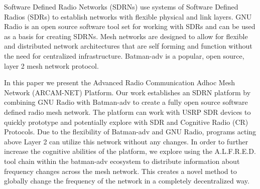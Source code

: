 Software Defined Radio Networks (SDRNs)  use systems of Software Defined Radios (SDRs) to establish networks with flexible physical and link layers. GNU Radio is an open source software tool set for working with SDRs and can be used as a basis for creating SDRNs. Mesh networks are designed to allow for flexible and distributed network architectures that are self forming and function without the need for centralized infrastructure. Batman-adv is a popular, open source, layer 2 mesh network protocol.

In this paper we present the Advanced Radio Communication Adhoc Mesh Network (ARCAM-NET) Platform. Our work establishes an SDRN platform by combining GNU Radio with Batman-adv to create a fully open source software defined radio mesh network. The platform can work with USRP SDR devices to quickly prototype and potentially explore with SDR and Cognitive Radio (CR) Protocols. Due to the flexibility of Batman-adv and GNU Radio, programs acting above Layer 2 can utilize this network without any changes. In order to further increase the cognitive abilities of the platform, we explore using the A.L.F.R.E.D. tool chain within the batman-adv ecosystem to distribute information about frequency changes across the mesh network. This creates a novel method to globally change the frequency of the network in a completely decentralized way. 

